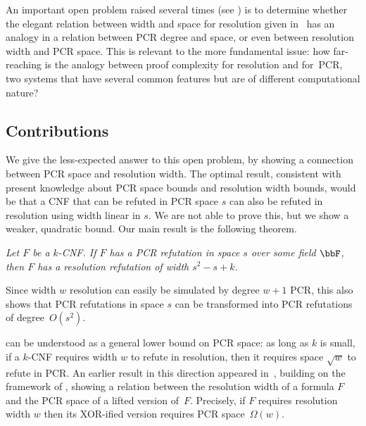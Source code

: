 An important open problem raised several times 
(see \cite{NorSurvey15,DBLP:journals/jacm/BonacinaG15,DBLP:journals/siamcomp/FilmusLNRT15,DBLP:conf/icalp/BerkholzN16,DBLP:conf/icalp/FilmusLMNV13,DBLP:journals/tocl/FilmusLMNV15}) 
is to determine whether the elegant relation between width and space for resolution given in~\cite{DBLP:journals/jcss/AtseriasD08} 
has an analogy in a relation between PCR degree and space, or even between resolution width and PCR space. 
This is relevant to the more fundamental issue: how far-reaching is the analogy between proof complexity for resolution
and for~PCR, two systems that have several common features but are of different computational nature? 


\subsection{Contributions}\label{subsec:contributions}

We give the less-expected answer to this open problem, by showing a 
connection between PCR space and resolution width.
The optimal result, consistent with present knowledge about
PCR space  bounds and resolution width bounds,  would be that a CNF that can be refuted in PCR space $s$ 
can also be refuted in resolution using width linear in $s$.
We are not able to prove this, but we show
 a weaker, quadratic bound.
Our main result is the following theorem. 
\begin{mainthm} 
\emph{Let $F$ be a $k$-CNF. If $F$ has a PCR refutation in space $s$ over some field $\bbF$, 
then $F$ has a resolution refutation of width $s^2-s+k$.}
\end{mainthm}

Since width $w$ resolution  can easily be simulated by degree $w+1$ PCR, 
this also shows that PCR refutations in space $s$ can be transformed into  PCR refutations of degree~$O(s^2)$.  

 can be understood as a general lower bound on PCR space:
as long as $k$ is small, 
if a $k$-CNF requires width $w$ to refute in resolution, then 
it requires space $\sqrt{w}$ to refute in PCR. 
%
An earlier result in this direction
appeared in~\cite{DBLP:conf/icalp/FilmusLMNV13},
building on the framework of \cite{ABRW, DBLP:journals/jacm/BonacinaG15},
showing
a relation between the resolution width of a formula $F$ and the PCR space of a lifted version of~$F$.
Precisely,
if $F$ requires  resolution width $w$
then its XOR-ified version requires PCR space~$\Omega(w)$.


